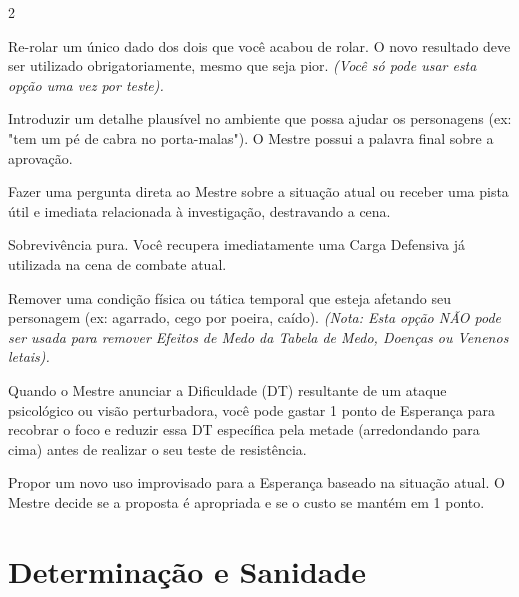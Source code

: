 \documentclass[a4paper,11pt,openany]{book}
\begin{document}
\begin{multicols}{2}
\begin{description}[font=\sffamily\bfseries\color{CodexRed}]

    \item[Forçar a Sorte:] Re-rolar um único dado dos dois que você acabou de rolar. O novo resultado deve ser utilizado obrigatoriamente, mesmo que seja pior. \textit{(Você só pode usar esta opção uma vez por teste).}
    
    \item[Editar a Cena:] Introduzir um detalhe plausível no ambiente que possa ajudar os personagens (ex: "tem um pé de cabra no porta-malas"). O Mestre possui a palavra final sobre a aprovação.
    
    \item[Epifania:] Fazer uma pergunta direta ao Mestre sobre a situação atual ou receber uma pista útil e imediata relacionada à investigação, destravando a cena.
    
    \item[Reação Instintiva:] Sobrevivência pura. Você recupera imediatamente uma Carga Defensiva já utilizada na cena de combate atual.
    
    \item[Determinação:] Remover uma condição física ou tática temporal que esteja afetando seu personagem (ex: agarrado, cego por poeira, caído). \textit{(Nota: Esta opção NÃO pode ser usada para remover Efeitos de Medo da Tabela de Medo, Doenças ou Venenos letais).}
    
    \item[Respirar Fundo:] Quando o Mestre anunciar a Dificuldade (DT) resultante de um ataque psicológico ou visão perturbadora, você pode gastar 1 ponto de Esperança para recobrar o foco e reduzir essa DT específica pela metade (arredondando para cima) antes de realizar o seu teste de resistência.
    
    \item[Fazer Sugestão:] Propor um novo uso improvisado para a Esperança baseado na situação atual. O Mestre decide se a proposta é apropriada e se o custo se mantém em 1 ponto.

\end{description}


\end{multicols}


\chapter{Determinação e Sanidade}
\end{document}

